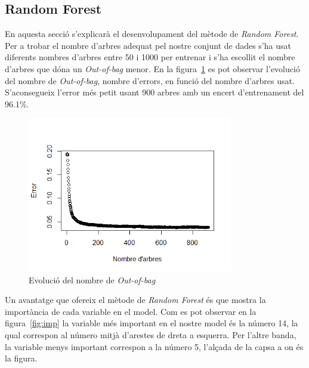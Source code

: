 \subsection{Random Forest}

En aquesta secció s'explicarà el desenvolupament del mètode de \textit{Random Forest}\cite{randomForestlibrary}. Per a trobar el nombre d'arbres adequat pel nostre conjunt de dades s'ha usat diferents nombres d'arbres entre 50 i 1000 per entrenar i s'ha escollit el nombre d'arbres que dóna un \textit{Out-of-bag} menor. En la figura~\ref{fig:OOB} es pot observar l'evolució del nombre de \textit{Out-of-bag}, nombre d'errors, en funció del nombre d'arbres usat. S'aconsegueix l'error més petit usant 900 arbres amb un encert d'entrenament del 96.1\%.

\begin{figure}[H]
    \centering
    \includegraphics[width=0.8\textwidth]{img/randomPlot.png}
    \caption{Evolució del nombre de \textit{Out-of-bag}}
    \label{fig:OOB}
\end{figure} 

Un avantatge que ofereix el mètode de \textit{Random Forest} és que mostra la importància de cada variable en el model. Com es pot observar en la figura~\ref{fig:imp} la variable més important en el nostre model és la número 14, la qual correspon al número mitjà d'arestes de dreta a esquerra. Per l'altre banda, la variable menys important correspon a la número 5, l'alçada de la capsa a on és la figura.

